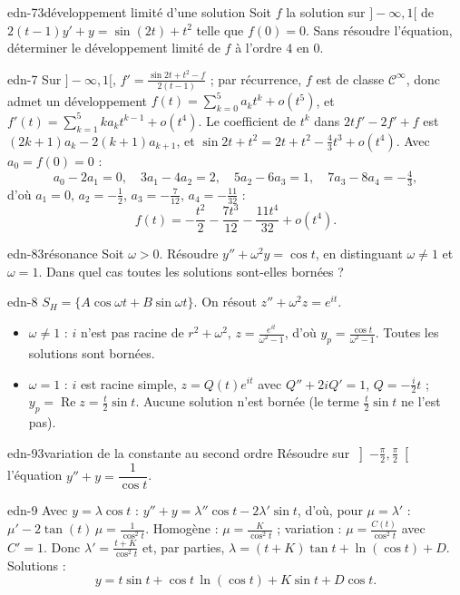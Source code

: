 \begin{exo}{edn-7}{3}{développement limité d'une solution}
Soit $f$ la solution sur $]-\infty,1[$ de $2(t-1)y'+y=\sin(2t)+t^2$ telle que $f(0)=0$. Sans résoudre l'équation, déterminer le
développement limité de $f$ à l'ordre $4$ en $0$.
\end{exo}
\begin{corrige}{edn-7}
Sur $]-\infty,1[$, $f'=\frac{\sin2t+t^2-f}{2(t-1)}$ ; par récurrence, $f$ est de classe $\mathcal C^\infty$, donc admet un
développement $f(t)=\sum_{k=0}^5a_kt^k+o(t^5)$, et $f'(t)=\sum_{k=1}^5ka_kt^{k-1}+o(t^4)$. Le coefficient de $t^k$ dans
$2tf'-2f'+f$ est $(2k+1)a_k-2(k+1)a_{k+1}$, et $\sin2t+t^2=2t+t^2-\frac43t^3+o(t^4)$. Avec $a_0=f(0)=0$ :
\[a_0-2a_1=0,\quad3a_1-4a_2=2,\quad5a_2-6a_3=1,\quad7a_3-8a_4=-\tfrac43,\]
d'où $a_1=0$, $a_2=-\frac12$, $a_3=-\frac7{12}$, $a_4=-\frac{11}{32}$ :
\[f(t)=-\frac{t^2}2-\frac{7t^3}{12}-\frac{11t^4}{32}+o(t^4).\]
\end{corrige}

\begin{exo}{edn-8}{3}{résonance}
Soit $\omega>0$. Résoudre $y''+\omega^2y=\cos t$, en distinguant $\omega\neq1$ et $\omega=1$. Dans quel cas toutes les solutions
sont-elles bornées ?
\end{exo}
\begin{corrige}{edn-8}
$S_H=\{A\cos\omega t+B\sin\omega t\}$. On résout $z''+\omega^2z=e^{it}$.
\begin{itemize}
\item $\omega\neq1$ : $i$ n'est pas racine de $r^2+\omega^2$, $z=\frac{e^{it}}{\omega^2-1}$, d'où $y_p=\frac{\cos t}{\omega^2-1}$.
Toutes les solutions sont bornées.
\item $\omega=1$ : $i$ est racine simple, $z=Q(t)e^{it}$ avec $Q''+2iQ'=1$, $Q=-\frac i2t$ ; $y_p=\operatorname{Re}z=\frac t2\sin t$.
Aucune solution n'est bornée (le terme $\frac t2\sin t$ ne l'est pas).
\end{itemize}
\end{corrige}

\begin{exo}{edn-9}{3}{variation de la constante au second ordre}
Résoudre sur $\left]-\frac\pi2,\frac\pi2\right[$ l'équation $y''+y=\dfrac1{\cos t}$.
\end{exo}
\begin{corrige}{edn-9}
Avec $y=\lambda\cos t$ : $y''+y=\lambda''\cos t-2\lambda'\sin t$, d'où, pour $\mu=\lambda'$ : $\mu'-2\tan(t)\,\mu=\frac1{\cos^2t}$.
Homogène : $\mu=\frac K{\cos^2t}$ ; variation : $\mu=\frac{C(t)}{\cos^2t}$ avec $C'=1$. Donc $\lambda'=\frac{t+K}{\cos^2t}$ et, par parties,
$\lambda=(t+K)\tan t+\ln(\cos t)+D$. Solutions :
\[y=t\sin t+\cos t\,\ln(\cos t)+K\sin t+D\cos t.\]
\end{corrige}

